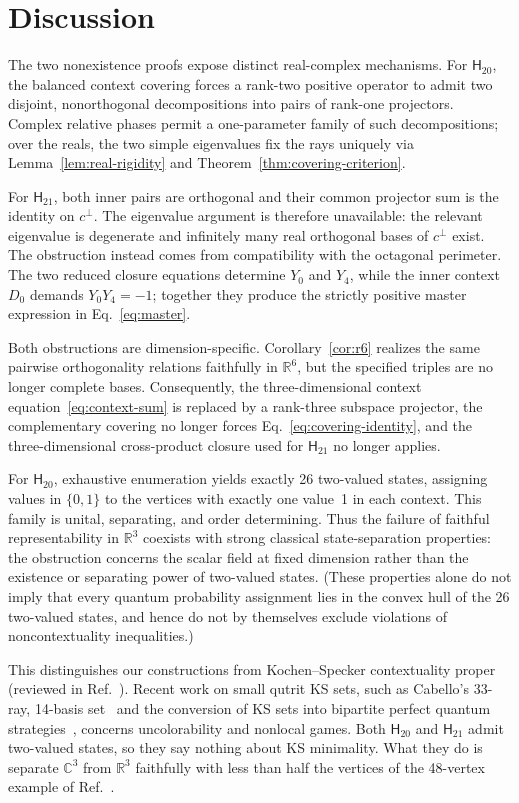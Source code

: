 \documentclass[twocolumn,aps,pra,floatfix,amsmath,amssymb,longbibliography]{revtex4-2}
\newenvironment{handrewrite}{\leavevmode\color{blue}}{}
\theoremstyle{definition}
\theoremstyle{remark}
\newcommand{\C}{\mathbb C}
\newcommand{\R}{\mathbb R}
\newcommand{\Htwenty}{\mathsf H_{20}}
\newcommand{\Htwentyone}{\mathsf H_{21}}
\begin{document}
\section{Discussion}
\label{sec:discussion}

The two nonexistence proofs expose distinct real-complex mechanisms.
For $\Htwenty$, the balanced context covering forces a rank-two positive
operator to admit two disjoint, nonorthogonal decompositions into pairs of
rank-one projectors.  Complex relative phases permit a one-parameter family
of such decompositions; over the reals, the two simple eigenvalues fix the
rays uniquely via Lemma~\ref{lem:real-rigidity} and
Theorem~\ref{thm:covering-criterion}.

For $\Htwentyone$, both inner pairs are orthogonal and their common
projector sum is the identity on $c^\perp$.  The eigenvalue argument is
therefore unavailable: the relevant eigenvalue is degenerate and infinitely
many real orthogonal bases of $c^\perp$ exist.  The obstruction instead comes
from compatibility with the octagonal perimeter.  The two reduced
closure equations determine $Y_0$ and $Y_4$, while the inner context
$D_0$ demands $Y_0Y_4=-1$; together they produce the strictly positive master
expression in Eq.~\eqref{eq:master}.

Both obstructions are dimension-specific.  Corollary~\ref{cor:r6} realizes the
same pairwise orthogonality relations faithfully in $\R^6$, but the specified
triples are no longer complete bases.  Consequently, the three-dimensional
context equation~\eqref{eq:context-sum} is replaced by a rank-three subspace
projector, the complementary covering no longer forces
Eq.~\eqref{eq:covering-identity}, and the three-dimensional cross-product
closure used for $\Htwentyone$ no longer applies.

For $\Htwenty$, exhaustive enumeration yields exactly 26 two-valued
states, assigning values in $\{0,1\}$ to the vertices with exactly one
value~1 in each context.  This family is unital, separating, and
order determining.  Thus the failure of faithful representability in
$\R^3$ coexists with strong classical state-separation properties:
the obstruction concerns the scalar field at fixed dimension rather
than the existence or separating power of two-valued states.  (These
properties alone do not imply that every quantum probability assignment
lies in the convex hull of the 26 two-valued states, and hence do not
by themselves exclude violations of noncontextuality inequalities.)

\begin{handrewrite}
This distinguishes our constructions from Kochen--Specker contextuality
proper (reviewed in Ref.~\cite{cabello2021contextuality}).  Recent work on
small qutrit KS sets, such as Cabello's 33-ray, 14-basis set~\cite{Cabello2025}
and the conversion of KS sets into bipartite perfect quantum
strategies~\cite{2024-cabello-trandafir0}, concerns uncolorability and
nonlocal games.  Both $\Htwenty$ and $\Htwentyone$ admit two-valued states,
so they say nothing about KS minimality.  What they do is separate $\C^3$
from $\R^3$ faithfully with less than half the vertices of the 48-vertex
example of Ref.~\cite{harding2025remarksIJTP}.
\end{handrewrite}
\end{document}
